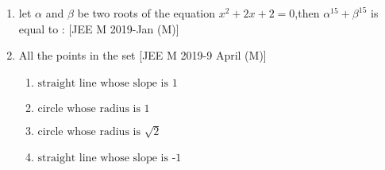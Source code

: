 \documentclass[journal,12pt,twocolumn,article]{IEEEtran}
\theoremstyle{remark}
\begin{document}
\begin{enumerate}[start = 14]
\item let $\alpha$ and $\beta$ be two roots of the equation $x^2+2x+2=0$,then $\alpha^{15}+\beta^{15}$ is equal to :                                       
\hfill{[JEE M 2019-Jan (M)]}                       
\begin{enumerate}                                   
\end{enumerate}

\item  All the points in the set 
\hfill{[JEE M 2019-9 April (M)]}                    
\begin{enumerate}                                   
                              
\item $\text {straight line whose slope is 1}$         
                             
\item $\text {circle whose radius is 1}$               

\item $\text {circle whose radius is $\sqrt2$}$

\item $\text {straight line whose slope is -1}$

\end{enumerate}
\end{enumerate}
\end{document}
